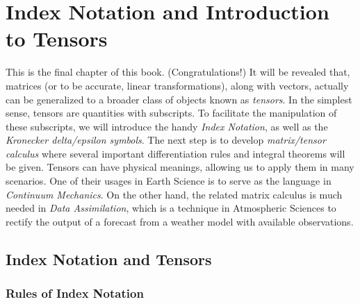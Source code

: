 \chapter{Index Notation and Introduction to Tensors}
\label{chapter:Tensor}

This is the final chapter of this book. (Congratulations!) It will be revealed that, matrices (or to be accurate, linear transformations), along with vectors, actually can be generalized to a broader class of objects known as \textit{tensors}. In the simplest sense, tensors are quantities with subscripts. To facilitate the manipulation of these subscripts, we will introduce the handy \textit{Index Notation}, as well as the \textit{Kronecker delta/epsilon symbols}. The next step is to develop \textit{matrix/tensor calculus} where several important differentiation rules and integral theorems will be given. Tensors can have physical meanings, allowing us to apply them in many scenarios. One of their usages in Earth Science is to serve as the language in \textit{Continuum Mechanics}. On the other hand, the related matrix calculus is much needed in \textit{Data Assimilation}, which is a technique in Atmospheric Sciences to rectify the output of a forecast from a weather model with available observations.

\section{Index Notation and Tensors}

\subsection{Rules of Index Notation}

